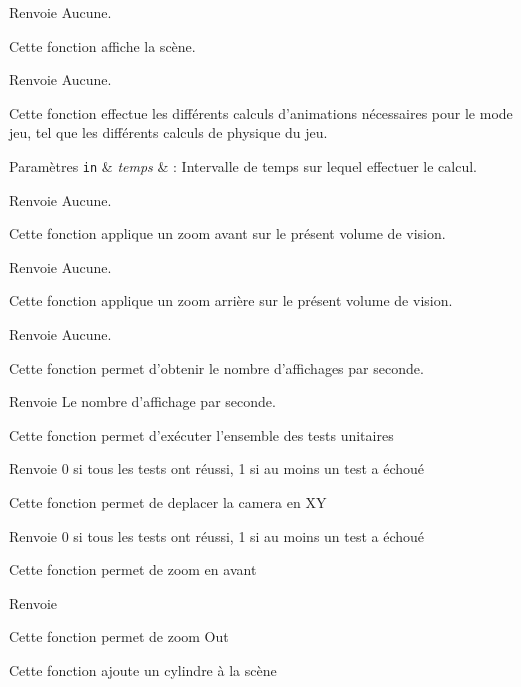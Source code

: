 \begin{DoxyReturn}{Renvoie}
Aucune.
\end{DoxyReturn}
Cette fonction affiche la scène.

\begin{DoxyReturn}{Renvoie}
Aucune.
\end{DoxyReturn}
Cette fonction effectue les différents calculs d'animations nécessaires pour le mode jeu, tel que les différents calculs de physique du jeu.


\begin{DoxyParams}[1]{Paramètres}
\mbox{\tt in}  & {\em temps} & \-: Intervalle de temps sur lequel effectuer le calcul.\\
\hline
\end{DoxyParams}
\begin{DoxyReturn}{Renvoie}
Aucune.
\end{DoxyReturn}
Cette fonction applique un zoom avant sur le présent volume de vision.

\begin{DoxyReturn}{Renvoie}
Aucune.
\end{DoxyReturn}
Cette fonction applique un zoom arrière sur le présent volume de vision.

\begin{DoxyReturn}{Renvoie}
Aucune.
\end{DoxyReturn}
Cette fonction permet d'obtenir le nombre d'affichages par seconde.

\begin{DoxyReturn}{Renvoie}
Le nombre d'affichage par seconde.
\end{DoxyReturn}
Cette fonction permet d'exécuter l'ensemble des tests unitaires

\begin{DoxyReturn}{Renvoie}
0 si tous les tests ont réussi, 1 si au moins un test a échoué
\end{DoxyReturn}
Cette fonction permet de deplacer la camera en X\-Y

\begin{DoxyReturn}{Renvoie}
0 si tous les tests ont réussi, 1 si au moins un test a échoué
\end{DoxyReturn}
Cette fonction permet de zoom en avant

\begin{DoxyReturn}{Renvoie}

\end{DoxyReturn}
Cette fonction permet de zoom Out

Cette fonction ajoute un cylindre à la scène

